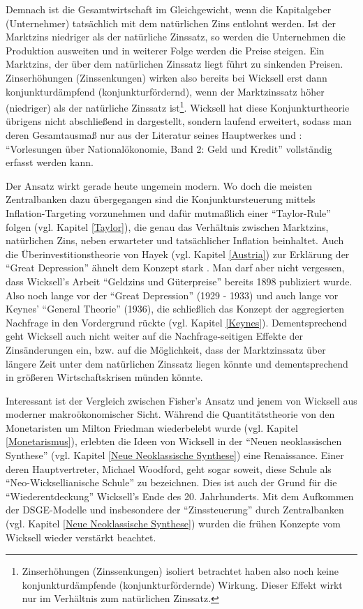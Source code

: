 Demnach ist die Gesamtwirtschaft im Gleichgewicht, wenn die Kapitalgeber (Unternehmer) tatsächlich mit dem natürlichen Zins entlohnt werden. Ist der Marktzins niedriger als der natürliche Zinssatz, so werden die Unternehmen die Produktion ausweiten und in weiterer Folge werden die Preise steigen. Ein Marktzins, der über dem natürlichen Zinssatz liegt führt zu sinkenden Preisen. Zinserhöhungen (Zinssenkungen) wirken also bereits bei Wicksell erst dann konjunkturdämpfend (konjunkturfördernd), wenn der Marktzinssatz höher (niedriger) als der natürliche Zinssatz ist\footnote{Zinserhöhungen (Zinssenkungen) isoliert betrachtet haben also noch keine konjunkturdämpfende (konjunkturfördernde) Wirkung. Dieser Effekt wirkt nur im Verhältnis zum natürlichen Zinssatz.}. Wicksell hat diese Konjunkturtheorie übrigens nicht abschließend in \textcite{Wicksel1898} dargestellt, sondern laufend erweitert, sodass man deren Gesamtausmaß nur aus der Literatur seines Hauptwerkes und \textcite{Wicksell1922}: "`Vorlesungen über Nationalökonomie, Band 2: Geld und Kredit"' vollständig erfasst werden kann. 

Der Ansatz wirkt gerade heute ungemein modern. Wo doch die meisten Zentralbanken dazu übergegangen sind die Konjunktursteuerung mittels Inflation-Targeting vorzunehmen und dafür mutmaßlich einer "`Taylor-Rule"' folgen (vgl. Kapitel \ref{Taylor}), die genau das Verhältnis zwischen Marktzins, natürlichen Zins, neben erwarteter und tatsächlicher Inflation beinhaltet. Auch die Überinvestitionstheorie von Hayek (vgl. Kapitel \ref{Austria}) zur Erklärung der "`Great Depression"' ähnelt dem Konzept stark \parencite[S. 201]{Grossekettler1989}. Man darf aber nicht vergessen, dass Wicksell's Arbeit "`Geldzins und Güterpreise"' bereits 1898 publiziert wurde. Also noch lange vor der "`Great Depression"' (1929 - 1933) und auch lange vor Keynes' "`General Theorie"' (1936), die schließlich das Konzept der aggregierten Nachfrage in den Vordergrund rückte (vgl. Kapitel \ref{Keynes}). Dementsprechend geht Wicksell auch nicht weiter auf die Nachfrage-seitigen Effekte der Zinsänderungen ein, bzw. auf die Möglichkeit, dass der Marktzinssatz über längere Zeit unter dem natürlichen Zinssatz liegen könnte und dementsprechend in größeren Wirtschaftskrisen münden könnte.

Interessant ist der Vergleich zwischen Fisher's Ansatz und jenem von Wicksell aus moderner makroökonomischer Sicht. Während die Quantitätstheorie von den Monetaristen um Milton Friedman wiederbelebt wurde (vgl. Kapitel \ref{Monetarismus}), erlebten die Ideen von Wicksell in der "`Neuen neoklassischen Synthese"' (vgl. Kapitel \ref{Neue Neoklassische Synthese}) eine Renaissance. Einer deren Hauptvertreter, Michael Woodford, geht sogar soweit, diese Schule als "`Neo-Wicksellianische Schule"' zu bezeichnen. Dies ist auch der Grund für die "`Wiederentdeckung"' Wicksell's Ende des 20. Jahrhunderts. Mit dem Aufkommen der DSGE-Modelle und insbesondere der "`Zinssteuerung"' durch Zentralbanken (vgl. Kapitel \ref{Neue Neoklassische Synthese}) wurden die frühen Konzepte vom Wicksell wieder verstärkt beachtet.

